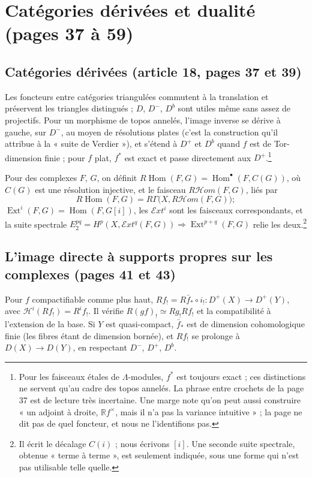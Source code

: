 \documentclass[11pt,a4paper]{article}
\begin{document}
\section*{Catégories dérivées et dualité (pages 37 à 59)}

\subsection*{Catégories dérivées (article 18, pages 37 et 39)}

Les foncteurs entre catégories triangulées commutent à la translation et
préservent les triangles distingués ; $D$, $D^{-}$, $D^{b}$ sont utiles même
sans assez de projectifs. Pour un morphisme de topos annelés, l'image inverse
se dérive à gauche, sur $D^{-}$, au moyen de résolutions plates (c'est la
construction qu'il attribue à la « suite de Verdier »), et s'étend à $D^{+}$
et $D^{b}$ quand $f$ est de Tor-dimension finie ; pour $f$ plat, $f^{*}$ est
exact et passe directement aux $D^{+}$.\footnote{Pour les faisceaux étales de
$\Lambda$-modules, $f^{*}$ est toujours exact ; ces distinctions ne servent
qu'au cadre des topos annelés. La phrase entre crochets de la page 37 est de
lecture très incertaine. Une marge note qu'on peut aussi construire « un
adjoint à droite, $\mathbb{R}f^{\times}$, mais il n'a pas la variance
intuitive » ; la page ne dit pas de quel foncteur, et nous ne
l'identifions pas.}

Pour des complexes $F$, $G$, on définit $R\operatorname{Hom}(F, G) =
\operatorname{Hom}^{\bullet}(F, C(G))$, où $C(G)$ est une résolution injective,
et le faisceau $R\mathcal{H}om(F, G)$, liés par
\[
  R\operatorname{Hom}(F, G) = R\Gamma\bigl(X, R\mathcal{H}om(F, G)\bigr) ;
\]
$\operatorname{Ext}^{i}(F, G) = \operatorname{Hom}(F, G[i])$, les
$\mathcal{E}xt^{i}$ sont les faisceaux correspondants, et la suite spectrale
$E_{2}^{pq} = H^{p}(X, \mathcal{E}xt^{q}(F, G)) \Rightarrow
\operatorname{Ext}^{p+q}(F, G)$ relie les deux.\footnote{Il écrit le décalage
$C(i)$ ; nous écrivons $[i]$. Une seconde suite spectrale, obtenue « terme à
terme », est seulement indiquée, sous une forme qui n'est pas utilisable
telle quelle.}

\subsection*{L'image directe à supports propres sur les complexes (pages 41 et 43)}

Pour $f$ compactifiable comme plus haut, $Rf_{!} = R\bar f_{*} \circ i_{!} :
D^{+}(X) \to D^{+}(Y)$, avec $\mathcal{H}^{i}(Rf_{!}) = R^{i}f_{!}$. Il vérifie
$R(gf)_{!} \simeq Rg_{!}Rf_{!}$ et la compatibilité à l'extension de la base.
Si $Y$ est quasi-compact, $\bar f_{*}$ est de dimension cohomologique finie (les
fibres étant de dimension bornée), et $Rf_{!}$ se prolonge à $D(X) \to D(Y)$, en
respectant $D^{-}$, $D^{+}$, $D^{b}$.
\end{document}
